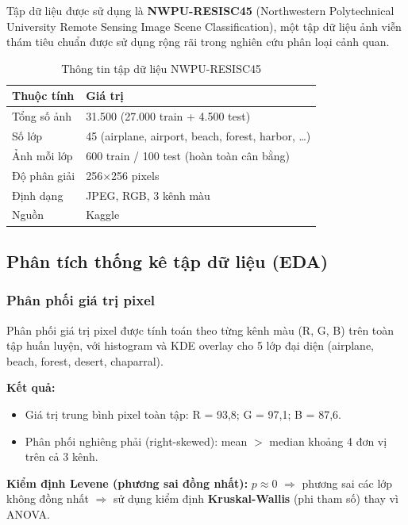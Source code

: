 \documentclass[12pt,a4paper]{article}
\let\oldtextbf\textbf
\renewcommand{\textbf}[1]{\oldtextbf{\textcolor{hcmublue}{#1}}}
\begin{document}
Tập dữ liệu được sử dụng là \textbf{NWPU-RESISC45} (Northwestern Polytechnical University Remote Sensing Image Scene Classification), một tập dữ liệu ảnh viễn thám tiêu chuẩn được sử dụng rộng rãi trong nghiên cứu phân loại cảnh quan.

\begin{table}[H]
\centering
\begin{tabular}{|l|l|}
\hline
\textbf{Thuộc tính} & \textbf{Giá trị} \\ \hline
Tổng số ảnh & 31.500 (27.000 train + 4.500 test) \\ \hline
Số lớp & 45 (airplane, airport, beach, forest, harbor, \ldots) \\ \hline
Ảnh mỗi lớp & 600 train / 100 test (hoàn toàn cân bằng) \\ \hline
Độ phân giải & 256$\times$256 pixels \\ \hline
Định dạng & JPEG, RGB, 3 kênh màu \\ \hline
Nguồn & Kaggle \\ \hline
\end{tabular}
\caption{Thông tin tập dữ liệu NWPU-RESISC45}
\label{tab:img_dataset}
\end{table}

\subsection{Phân tích thống kê tập dữ liệu (EDA)}

\subsubsection{Phân phối giá trị pixel}

Phân phối giá trị pixel được tính toán theo từng kênh màu (R, G, B) trên toàn tập huấn luyện, với histogram và KDE overlay cho 5 lớp đại diện (airplane, beach, forest, desert, chaparral).

\textbf{Kết quả:}
\begin{itemize}
    \item Giá trị trung bình pixel toàn tập: R = 93,8; G = 97,1; B = 87,6.
    \item Phân phối nghiêng phải (right-skewed): mean $>$ median khoảng 4 đơn vị trên cả 3 kênh.
\end{itemize}

\textbf{Kiểm định Levene (phương sai đồng nhất):} $p \approx 0$ $\Rightarrow$ phương sai các lớp không đồng nhất $\Rightarrow$ sử dụng kiểm định \textbf{Kruskal-Wallis} (phi tham số) thay vì ANOVA.
\end{document}
